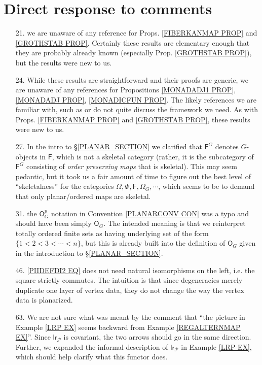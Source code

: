 \documentclass{article}
\begin{document}
\section{Direct response to comments}

\begin{itemize}
	\item[21.] we are unaware of any reference for Props. 
	\ref{FIBERKANMAP PROP} and \ref{GROTHSTAB PROP}.
	Certainly these results are elementary enough that they are probably already known (especially Prop. \ref{GROTHSTAB PROP}),
	but the results were new to us. 
	
	\item[24.] While these results are straightforward 
	and their proofs are generic, 
	we are unaware of any references for Propositions \ref{MONADADJ1 PROP}, \ref{MONADADJ PROP}, \ref{MONADICFUN PROP}. The likely references we are familiar with, such as 
	\cite{Bo94} or \cite{Ri17} do not quite discuss the framework we need.
	As with Props. 
	\ref{FIBERKANMAP PROP} and \ref{GROTHSTAB PROP},
	these results were new to us.
	
	\item[27.] In the intro to \S \ref{PLANAR_SECTION} we
	clarified that $\mathsf{F}^G$ denotes $G$-objects in $\mathsf{F}$,
	which is not a skeletal category (rather, it is the subcategory of $\mathsf{F}^G$ consisting of \emph{order preserving maps} that is skeletal).
	This may seem pedantic,
	but it took us a fair amount of time to figure out the best level of ``skeletalness'' for the categories 
	$\Omega, \Phi, \mathsf{F}, \Omega_G, \cdots$, 
	which seems to be to demand that only planar/ordered maps are skeletal.
	
	\item[31.] the $\mathsf{O}^p_G$ notation in 
	Convention \ref{PLANARCONV CON}
	was a typo and should have been simply $\mathsf{O}_G$.
	The intended meaning is that we reinterpret totally ordered finite sets as having underlying set of the form
	$\{1<2<3<\cdots <n\}$,
	but this is already built into the definition of 
	$\mathsf{O}_G$ given in the introduction to
	\S \ref{PLANAR_SECTION}.
	
	\item[46.] \eqref{PIIDEFDI2 EQ} does not need natural isomorphisms on the left, i.e. the square strictly commutes. The intuition is that since degeneracies merely duplicate one layer of vertex data, they do not change the way the vertex data is planarized. 

	\item[63.]
	We are not sure what was meant by the comment that
	``the picture in Example \ref{LRP EX} seems backward from
	Example \ref{REGALTERNMAP EX}''.
	Since $\mathsf{lr}_{\mathcal{P}}$
	is covariant, the two arrows should go in the same direction.
	Further, we expanded the informal description
	of $\mathsf{lr}_{\mathcal{P}}$
	in Example \ref{LRP EX},
	which should help clarify what this functor does.
	

\end{itemize}
\end{document}
